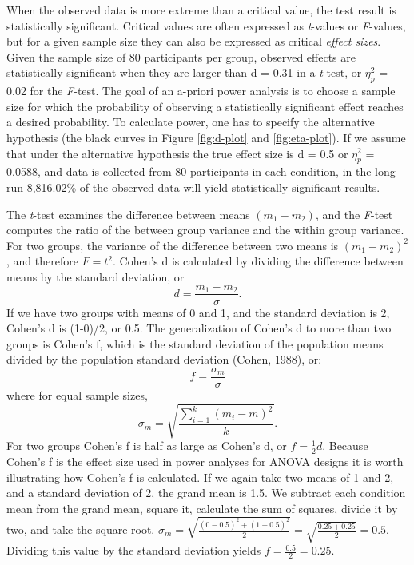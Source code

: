 \documentclass[
  ,jou,floatsintext]{apa6}
\begin{document}
When the observed data is more extreme than a critical value, the test result is statistically significant.
Critical values are often expressed as \emph{t}-values or \emph{F}-values, but for a given sample size they can also be expressed as critical \emph{effect sizes}.
Given the sample size of 80 participants per group, observed effects are statistically significant when they are larger than d = 0.31 in a \emph{t}-test, or \(\eta_p^2\) = 0.02 for the \emph{F}-test.
The goal of an a-priori power analysis is to choose a sample size for which the probability of observing a statistically significant effect reaches a desired probability.
To calculate power, one has to specify the alternative hypothesis (the black curves in Figure \ref{fig:d-plot} and \ref{fig:eta-plot}).
If we assume that under the alternative hypothesis the true effect size is d = 0.5 or \(\eta_p^2\) = 0.0588, and data is collected from 80 participants in each condition, in the long run 8,816.02\% of the observed data will yield statistically significant results.

The \emph{t}-test examines the difference between means \((m_1 - m_2)\), and the \emph{F}-test computes the ratio of the between group variance and the within group variance.
For two groups, the variance of the difference between two means is \((m_1 - m_2)^2\), and therefore \(F = t^2\).
Cohen's d is calculated by dividing the difference between means by the standard deviation, or
\begin{equation}
d = \frac{m_1-m_2}{\sigma}.
\end{equation}
If we have two groups with means of 0 and 1, and the standard deviation is 2, Cohen's d is (1-0)/2, or 0.5.
The generalization of Cohen's d to more than two groups is Cohen's f, which is the standard deviation of the population means divided by the population standard deviation (Cohen, 1988), or:
\begin{equation}
f = \frac{\sigma _{ m }}{\sigma}
\end{equation}
where for equal sample sizes,
\begin{equation}
\sigma _{ m } = \sqrt { \frac { \sum_ { i = 1 } ^ { k } ( m _ { i } - m ) ^ { 2 } } { k } }.
\end{equation}
For two groups Cohen's f is half as large as Cohen's d, or \(f = \frac{1}{2}d\).
Because Cohen's f is the effect size used in power analyses for ANOVA designs it is worth illustrating how Cohen's f is calculated.
If we again take two means of 1 and 2, and a standard deviation of 2, the grand mean is 1.5.
We subtract each condition mean from the grand mean, square it, calculate the sum of squares, divide it by two, and take the square root.
\(\sigma_m = \sqrt{\frac{(0-0.5)^2+(1-0.5)^2}{2}} = \sqrt{\frac{0.25+0.25}{2}} = 0.5\).
Dividing this value by the standard deviation yields \(f = \frac{0.5}{2} = 0.25.\)
\end{document}
